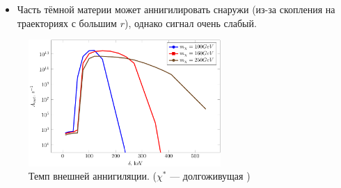 \begin{itemize}
	\item Часть тёмной материи может аннигилировать снаружи (из-за скопления на траекториях с большим $r$), однако сигнал очень слабый.
\end{itemize}

\begin{figure}[!h]
	\centering
	\includegraphics[width=0.65\textwidth]{images/Aout.png}
	\caption{Темп внешней аннигиляции. ($\chi^*$ --- долгоживущая )}
\end{figure}